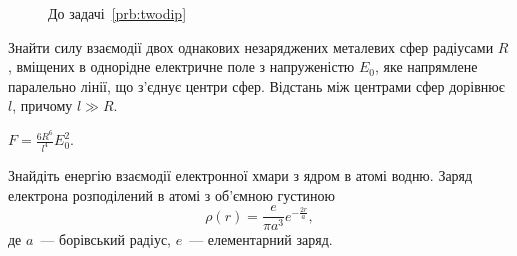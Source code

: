 	\begin{figure}[!h]\centering
		\caption{До задачі~\ref{prb:twodip}}
		\label{twodip}
	\end{figure}



\begin{problem}%
Знайти силу взаємодії двох однакових незаряджених металевих сфер радіусами $R$, вміщених в однорідне електричне поле з напруженістю $E_0$, яке напрямлене паралельно лінії, що з'єднує центри сфер. Відстань між центрами сфер дорівнює $l$, причому $l \gg R$.

\begin{solution}
	$F = \frac{6R^6}{l^4} E_0^2$.
\end{solution}
\end{problem}

\begin{problem}
    Знайдіть енергію взаємодії електронної хмари з ядром в атомі водню. Заряд електрона розподілений в атомі з об'ємною густиною 
    \[
        \rho(r) = \frac{e}{\pi a^3}e^{-\frac{2r}{a}},
   \]
де $a$~--- борівський радіус, $e$~--- елементарний заряд.
\end{problem}



